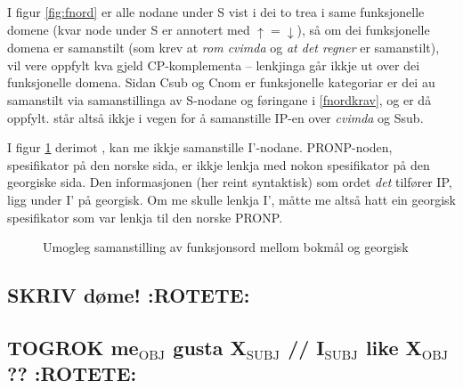 \documentclass[11pt,a4paper,oneside,draft]{book}
\begin{document}
I figur \ref{fig:fnord} er alle nodane under S vist i dei to trea i
same funksjonelle domene (kvar node under S er annotert med $\uparrow
= \downarrow$), så om dei funksjonelle domena er samanstilt (som krev
at \emph{rom cvimda} og \emph{at det regner} er samanstilt), vil \Last[a og -b]
vere oppfylt kva gjeld CP-komplementa -- lenkjinga går ikkje ut over
dei funksjonelle domena. Sidan Csub og Cnom er funksjonelle kategoriar
er dei au samanstilt via samanstillinga av S-nodane og føringane i
\ref{fnordkrav}, og \Last[c] er då oppfylt. \Last står altså ikkje i
vegen for å samanstille IP-en over \emph{cvimda} og Ssub.

I figur \ref{fig:ikkjesub} derimot \citep{mrs-suite}, kan me ikkje
samanstille I'-nodane. PRONP-noden, spesifikator på den norske sida,
er ikkje lenkja med nokon spesifikator på den georgiske sida. Den
informasjonen (her reint syntaktisk) som ordet \emph{det} tilfører IP, ligg
under I' på georgisk. Om me skulle lenkja I', måtte me altså hatt ein
georgisk spesifikator som var lenkja til den norske PRONP.

\begin{figure}[htp]
 \vfill{} %
\caption{Umogleg samanstilling av funksjonsord mellom bokmål og georgisk}
 \label{fig:ikkjesub}
\end{figure}

\subsection{\textbf{SKRIV} døme! \textbf{:ROTETE:}}
\label{sec-3.7.1}

\subsection{\textbf{TOGROK} me$_{\mathrm{OBJ}}$ gusta X$_{\mathrm{SUBJ}}$ // I$_{\mathrm{SUBJ}}$ like X$_{\mathrm{OBJ}}$ ?? \textbf{:ROTETE:}}
\label{sec-3.7.2}
\end{document}
